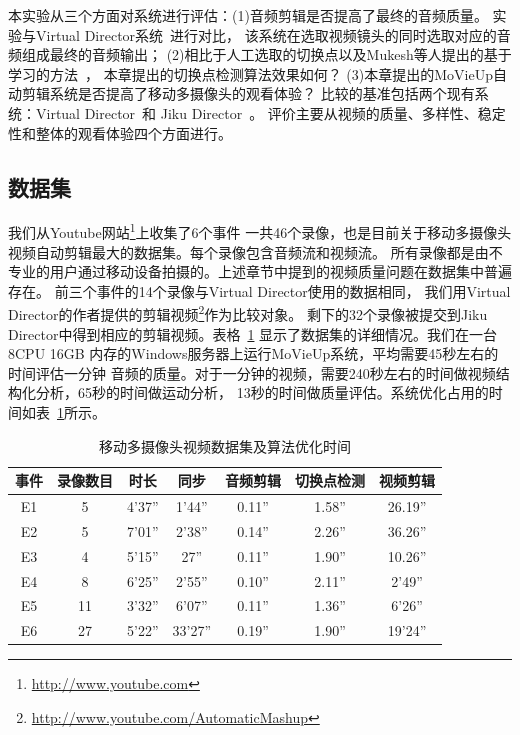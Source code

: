 \documentclass[doctor]{ustcthesis}
\begin{document}
本实验从三个方面对系统进行评估：(1)音频剪辑是否提高了最终的音频质量。
实验与Virtual Director系统~\cite{DBLP:conf/mm/ShresthaWWBA10}进行对比，
该系统在选取视频镜头的同时选取对应的音频组成最终的音频输出；
(2)相比于人工选取的切换点以及Mukesh等人提出的基于学习的方法~\cite{DBLP:conf/mm/SainiGYO12}，
本章提出的切换点检测算法效果如何？
(3)本章提出的MoVieUp自动剪辑系统是否提高了移动多摄像头的观看体验？
比较的基准包括两个现有系统：Virtual Director~\cite{DBLP:conf/mm/ShresthaWWBA10}和
Jiku Director~\cite{DBLP:conf/mm/SainiGYO12}。
评价主要从视频的质量、多样性、稳定性和整体的观看体验四个方面进行。

\subsection{数据集}
我们从Youtube网站\footnote{\url{http://www.youtube.com}}上收集了6个事件
一共46个录像，也是目前关于移动多摄像头视频自动剪辑最大的数据集。每个录像包含音频流和视频流。
所有录像都是由不专业的用户通过移动设备拍摄的。上述章节中提到的视频质量问题在数据集中普遍存在。
前三个事件的14个录像与Virtual Director使用的数据相同，
我们用Virtual Director的作者提供的剪辑视频\footnote{\url{http://www.youtube.com/AutomaticMashup}}作为比较对象。
剩下的32个录像被提交到Jiku Director中得到相应的剪辑视频。表格~\ref{tab:mashup-dataset-opt-time}
显示了数据集的详细情况。我们在一台8CPU 16GB
内存的Windows服务器上运行MoVieUp系统，平均需要45秒左右的时间评估一分钟
音频的质量。对于一分钟的视频，需要240秒左右的时间做视频结构化分析，65秒的时间做运动分析，
13秒的时间做质量评估。系统优化占用的时间如表~\ref{tab:mashup-dataset-opt-time}所示。

\begin{table}[htbp]
    \centering
    \caption{移动多摄像头视频数据集及算法优化时间}
    \label{tab:mashup-dataset-opt-time}
    \begin{tabular}{|c|c|c|c|c|c|c|}
        \hline
        事件 & 录像数目 & 时长 & 同步 & 音频剪辑 & 切换点检测 & 视频剪辑 \\
        \hline
        E1 & 5 & 4'37'' &1'44''  & 0.11'' & 1.58'' & 26.19''  \\ \hline
        E2 & 5 & 7'01'' &2'38''  &0.14'' & 2.26'' & 36.26''  \\ \hline
        E3 & 4 & 5'15'' &27''  &0.11'' & 1.90'' & 10.26''  \\ \hline
        E4 & 8 & 6'25'' &2'55''  & 0.10'' & 2.11'' & 2'49'' \\ \hline
        E5 & 11 & 3'32''&6'07''  & 0.11'' & 1.36'' & 6'26'' \\ \hline
        E6 & 27 & 5'22''&33'27''  & 0.19'' & 1.90'' & 19'24'' \\ \hline
    \end{tabular}
\end{table}
\end{document}
